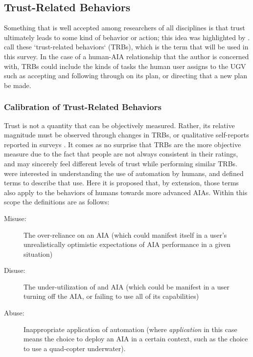 \subsection{Trust-Related Behaviors} \label{sec:trbs}
Something that is well accepted among researchers of all disciplines is that trust ultimately leads to some kind of behavior or action; this idea was highlighted by \citet{Lewis1985-pr}.  \citet{McKnight2001-fa} call these `trust-related behaviors` (TRBs), which is the term that will be used in this survey. In the case of a human-AIA relationship that the author is concerned with, TRBs could include the kinds of tasks the human user assigns to the UGV such as accepting and following through on its plan, or directing that a new plan be made.

\subsubsection{Calibration of Trust-Related Behaviors}
    Trust is not a quantity that can be objectively measured. Rather, its relative magnitude must be observed through changes in TRBs, or qualitative self-reports reported in surveys \cite{Muir1996-gt}. It comes as no surprise that TRBs are the more objective measure due to the fact that people are not always consistent in their ratings, and may sincerely feel different levels of trust while performing similar TRBs. \citet{Parasuraman1997-co} were interested in understanding the use of automation by humans, and defined terms to describe that use. Here it is proposed that, by extension, those terms also apply to the behaviors of humans towards more advanced AIAs. Within this scope the definitions are as follows:
    
    \begin{description}
        \item [Misuse:] The over-reliance on an AIA (which could manifest itself in a user's unrealistically optimistic expectations of AIA performance in a given situation)
        \item [Disuse:] The under-utilization of and AIA (which could be manifest in a user turning off the AIA, or failing to use all of its capabilities)
        \item [Abuse:] Inappropriate application of automation (where \emph{application} in this case means the choice to deploy an AIA in a certain context, such as the choice to use a quad-copter underwater).
    \end{description}

